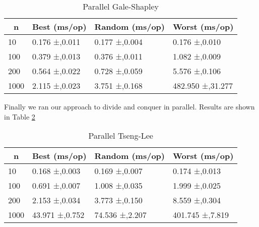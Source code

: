 \begin{table}[!ht]
    \centering
\begin{tabular}{|l|l|l|l|}
\hline
\multicolumn{1}{|c|}{\textbf{n}} & \multicolumn{1}{c|}{\textbf{Best (ms/op)}} & \multicolumn{1}{c|}{\textbf{Random (ms/op)}} & \multicolumn{1}{c|}{\textbf{Worst (ms/op)}} \\ \hline
10                               & 0.176 ±,0.011                              & 0.177 ±,0.004                                & 0.176 ±,0.010                               \\ \hline
100                              & 0.379 ±,0.013                              & 0.376 ±,0.011                                & 1.082 ±,0.009                               \\ \hline
200                              & 0.564 ±,0.022                              & 0.728 ±,0.059                                & 5.576 ±,0.106                               \\ \hline
1000                             & 2.115 ±,0.023                              & 3.751 ±,0.168                                & 482.950 ±,31.277                            \\ \hline
\end{tabular}
    \caption{Parallel Gale-Shapley}
    \label{tab:parallel-gale-shapley}
\end{table}

Finally we ran our approach to divide and conquer in parallel. Results are shown in Table \ref{tab:parallel-tseng-lee}

\begin{table}[!ht]
    \centering
\begin{tabular}{|l|l|l|l|}
\hline
\multicolumn{1}{|c|}{\textbf{n}} & \multicolumn{1}{c|}{\textbf{Best (ms/op)}} & \multicolumn{1}{c|}{\textbf{Random (ms/op)}} & \multicolumn{1}{c|}{\textbf{Worst (ms/op)}} \\ \hline
10                               & 0.168 ±,0.003                              & 0.169 ±,0.007                                & 0.174 ±,0.013                               \\ \hline
100                              & 0.691 ±,0.007                              & 1.008 ±,0.035                                & 1.999 ±,0.025                               \\ \hline
200                              & 2.153 ±,0.034                              & 3.773 ±,0.150                                & 8.559 ±,0.304                               \\ \hline
1000                             & 43.971 ±,0.752                             & 74.536 ±,2.207                               & 401.745 ±,7.819                             \\ \hline
\end{tabular}
    \caption{Parallel Tseng-Lee}
    \label{tab:parallel-tseng-lee}
\end{table}